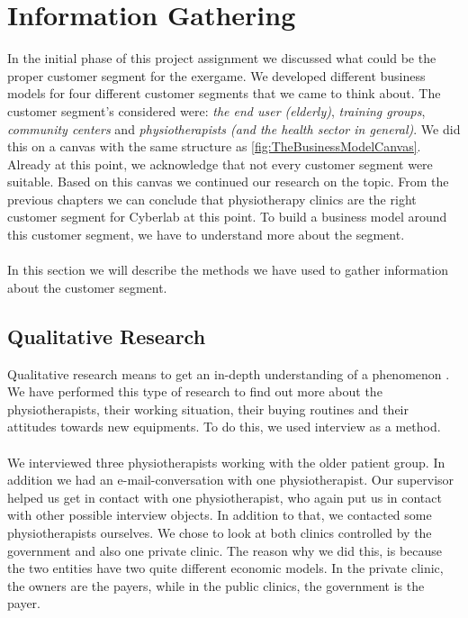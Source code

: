 \chapter{Information Gathering}
In the initial phase of this project assignment we discussed what could be the proper customer segment for the exergame. We developed different business models for four different customer segments that we came to think about. The customer segment's considered were: \emph{the end user (elderly)}, \emph{training groups}, \emph{community centers} and \emph{physiotherapists (and the health sector in general)}.  We did this on a canvas with the same structure as \ref{fig:TheBusinessModelCanvas}. Already at this point, we acknowledge that not every customer segment were suitable. Based on this canvas we continued our research on the topic. From the previous chapters we can conclude that physiotherapy clinics are the right customer segment for Cyberlab at this point. To build a business model around this customer segment, we have to understand more about the segment. \\ \\
In this section we will describe the methods we have used to gather information about the customer segment.

\section{Qualitative Research}
Qualitative research means to get an in-depth understanding of a phenomenon \cite{interview2}. We have performed this type of research to find out more about the physiotherapists, their working situation, their buying routines and their attitudes towards new equipments. To do this, we used interview as a method. \\ \\
We interviewed three physiotherapists working with the older patient group. In addition we had an e-mail-conversation with one physiotherapist. Our supervisor helped us get in contact with one physiotherapist, who again put us in contact with other possible interview objects. In addition to that, we contacted some physiotherapists ourselves. We chose to look at both clinics controlled by the government and also one private clinic. The reason why we did this, is because the two entities have two quite different economic models. In the private clinic, the owners are the payers, while in the public clinics, the government is the payer.


